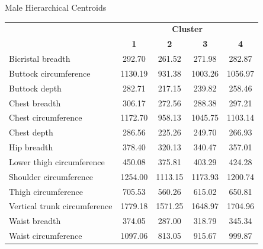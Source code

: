 \documentclass[10pt]{beamer}
\begin{document}
\begin{frame}{Male Hierarchical Centroids}
	\scriptsize
	\centering
	\begin{tabular}{lcccc}
		\cline{2-5}
		                             & \multicolumn{4}{c}{\textbf{Cluster}}                                                \\
		                             & \textbf{1}                           & \textbf{2}    & \textbf{3}    & \textbf{4}   \\
		\hline\hline
		Bicristal breadth            & 292.70                               & 261.52        & 271.98        & 282.87       \\
		Buttock circumference        & 1130.19                              & 931.38        & 1003.26       & 1056.97      \\
		Buttock depth                & 282.71                               & 217.15        & 239.82        & 258.46       \\
		Chest breadth                & 306.17                               & 272.56        & 288.38        & 297.21       \\
		Chest circumference          & 1172.70                              & 958.13        & 1045.75       & 1103.14      \\
		Chest depth                  & 286.56                               & 225.26        & 249.70        & 266.93       \\
		Hip breadth                  & 378.40                               & 320.13        & 340.47        & 357.01       \\
		Lower thigh circumference    & 450.08                               & 375.81        & 403.29        & 424.28       \\
		Shoulder circumference       & 1254.00                              & 1113.15       & 1173.93       & 1200.74      \\
		Thigh circumference          & 705.53                               & 560.26        & 615.02        & 650.81       \\
		Vertical trunk circumference & 1779.18                              & 1571.25       & 1648.97       & 1704.96      \\
		Waist breadth                & 374.05                               & 287.00        & 318.79        & 345.34       \\
		Waist circumference          & 1097.06                              & 813.05        & 915.67        & 999.87       \\

\end{tabular}
\end{frame}
\end{document}
